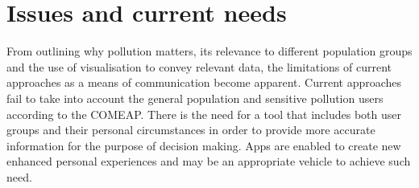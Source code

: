 \section{Issues and current needs}
From outlining why pollution matters, its relevance to different population groups and the use of visualisation to convey relevant data, the limitations of current approaches as a means of communication become apparent. Current approaches fail to take into account the general population and sensitive pollution users according to the COMEAP. There is the need for a tool that includes both user groups and their personal circumstances in order to provide more accurate information for the purpose of decision making. Apps are enabled to create new enhanced personal experiences and may be an appropriate vehicle to achieve such need.